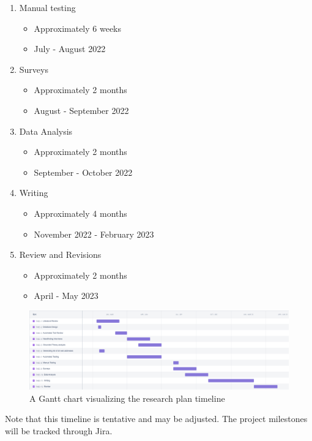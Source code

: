 \documentclass{article}
\begin{document}
\begin{enumerate}
\begin{itemize}
    \end{itemize}
    \item Manual testing
    \begin{itemize}
        \item Approximately 6 weeks
        \item July - August 2022
    \end{itemize}
    \item Surveys
    \begin{itemize}
        \item Approximately 2 months
        \item August - September 2022
    \end{itemize}
    \item Data Analysis
    \begin{itemize}
        \item Approximately 2 months
        \item September - October 2022
    \end{itemize}
    \item Writing
    \begin{itemize}
        \item Approximately 4 months
        \item November 2022 - February 2023
    \end{itemize}
    \item Review and Revisions
    \begin{itemize}
        \item Approximately 2 months
        \item April - May 2023
    \end{itemize}
\end{enumerate}

\begin{figure}[h]
    \centering
    \includegraphics[width=\textwidth]{thesis_2022-01-11_05.54pm.png}
    \caption{A Gantt chart visualizing the research plan timeline}
    \label{fig:gantt1}
\end{figure}

Note that this timeline is tentative and may be adjusted. The project milestones will be tracked through Jira. 

\printglossary



\end{document}
